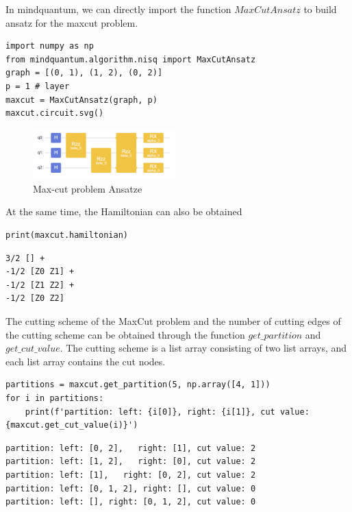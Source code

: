 In mindquantum,  we can directly import the function $MaxCutAnsatz$ to build ansatz for the maxcut problem.
\begin{lstlisting}
import numpy as np
from mindquantum.algorithm.nisq import MaxCutAnsatz
graph = [(0, 1), (1, 2), (0, 2)]
p = 1 # layer
maxcut = MaxCutAnsatz(graph, p)
maxcut.circuit.svg()
\end{lstlisting}
\begin{figure}[H]
\centering
\includegraphics[width=0.49\textwidth]{5.2_figures/5.2_QAOA_ansatze}
\caption{Max-cut problem Ansatze}
\label{5.1_QAOA}
\end{figure}
At the same time, the Hamiltonian can also be obtained
\begin{lstlisting}
print(maxcut.hamiltonian)
\end{lstlisting}
\begin{lstlisting}
3/2 [] +
-1/2 [Z0 Z1] +
-1/2 [Z1 Z2] +
-1/2 [Z0 Z2]
\end{lstlisting}
The cutting scheme of the MaxCut problem and the number of cutting edges of the cutting scheme can be obtained through the function $get\_partition$ and $get\_cut\_value$. The cutting scheme is a list array consisting of two list arrays, and each list array contains the cut nodes.
\begin{lstlisting}
partitions = maxcut.get_partition(5, np.array([4, 1]))
for i in partitions:
    print(f'partition: left: {i[0]}, right: {i[1]}, cut value: {maxcut.get_cut_value(i)}')
\end{lstlisting}
\begin{lstlisting}
partition: left: [0, 2],   right: [1], cut value: 2
partition: left: [1, 2],   right: [0], cut value: 2
partition: left: [1],   right: [0, 2], cut value: 2
partition: left: [0, 1, 2], right: [], cut value: 0
partition: left: [], right: [0, 1, 2], cut value: 0
\end{lstlisting}










